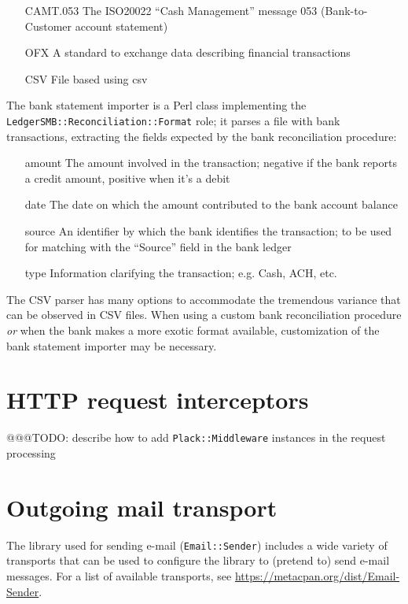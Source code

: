 \begin{itemize}
	\item [CAMT.053] The \gls{ISO20022} ``Cash Management'' message 053
		(Bank-to-Customer account statement)
	\item [\gls{OFX}\index{OFX}] A standard to exchange data describing financial transactions
	\item [CSV]  File based using \gls{csv}
\end{itemize}

The bank statement importer is a Perl class implementing the
\texttt{LedgerSMB::Reconciliation::Format} role; it parses a file with bank
transactions, extracting the fields expected by the bank reconciliation procedure:

\begin{itemize}
	\item [amount] The amount involved in the transaction; negative if the bank
		reports a credit amount, positive when it's a debit
	\item [date] The date on which the amount contributed to the bank account balance
	\item [source] An identifier by which the bank identifies the transaction; to be
		used for matching with the ``Source'' field in the bank ledger
	\item [type] Information clarifying the transaction; e.g. Cash, ACH, etc.
\end{itemize}

The CSV parser has many options to accommodate the tremendous variance that can be
observed in CSV files.  When using a custom bank reconciliation procedure \textit{or}
when the bank makes a more exotic format available, customization of the bank statement
importer may be necessary.

\section{HTTP request interceptors}
\label{sec-customization-http-requests}

@@@TODO: describe how to add \texttt{Plack::Middleware} instances in the request processing

\section{Outgoing mail transport}
\label{sec-customization-outgoing-mail}

The library used for sending e-mail (\texttt{Email::Sender})
includes a wide variety of transports that can be used to configure the library to (pretend to) send
e-mail messages.  For a list of available transports, see \url{https://metacpan.org/dist/Email-Sender}.

